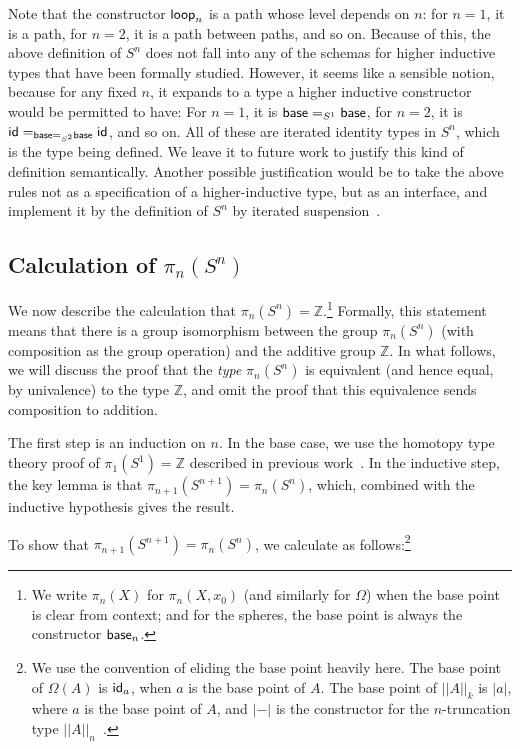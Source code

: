 Note that the constructor $\mathsf{loop}_n$ is a path whose level depends
on $n$: for $n = 1$, it is a path, for $n = 2$, it is a path between
paths, and so on.  Because of this, the above definition of $S^n$ does
not fall into any of the schemas for higher inductive types that have
been formally studied.  However, it seems like a sensible notion,
because for any fixed $n$, it expands to a type a higher inductive
constructor would be permitted to have: For $n = 1$, it is $\mathsf{base}
=_{S^1} \mathsf{base}$, for $n=2$, it is $\mathsf{id} =_{\mathsf{base} =_{S^2}
  \mathsf{base}} \mathsf{id}$, and so on.  All of these are iterated identity
types in $S^n$, which is the type being defined.  We leave it to future
work to justify this kind of definition semantically.  Another
possible justification would be to take the above rules not as a specification of a
higher-inductive type, but as an interface, and implement it by the
 definition of $S^n$ by iterated suspension~\citep[Section 6.5]{uf13hott-book}.  

\subsection{Calculation of $\pi_n(S^n)$}

We now describe the calculation that $\pi_n(S^n) = \mathbb{Z}$.\footnote{We
write $\pi_n(X)$ for $\pi_n(X,x_0)$ (and similarly for $\Omega$) when the
base point is clear from context; and for the spheres, the base point is
always the constructor $\mathsf{base}_n$.}  Formally, this statement means
that there is a group isomorphism between the group $\pi_n(S^n)$ (with
composition as the group operation) and the additive group
$\mathbb{Z}$.  In what follows, we will discuss the proof that the
\emph{type} $\pi_n(S^n)$ is equivalent (and hence equal, by univalence) to the
type $\mathbb{Z}$, and omit the proof that this equivalence sends
composition to addition.   

The
first step is an induction on $n$.  In the base case, we use the
homotopy type theory proof of $\pi_1(S^1) = \mathbb{Z}$ described in
previous work~\citep{ls13pi1s1}.  In the inductive step, the key lemma
is that $\pi_{n+1}(S^{n+1}) = \pi_n(S^n)$, which, combined with the
inductive hypothesis gives the result.  

To show that $\pi_{n+1}(S^{n+1}) = \pi_n(S^n)$, we calculate as
follows:\footnote{We use the convention of eliding the base point
  heavily here.  The base point of $\Omega(A)$ is $\mathsf{id}_a$, when
  $a$ is the base point of $A$.  The base point of $||A||_k$ is $|a|$,
  where $a$ is the base point of $A$, and $|-|$ is the constructor for
  the $n$-truncation type $||A||_n$~\citep[Section 7.3]{uf13hott-book}.}

